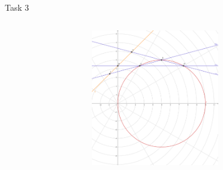 \documentclass[aspectratio=169]{beamer}
\begin{document}
\begin{frame}[t]{Task 3}
{\begin{columns}[T,onlytextwidth]
            \begin{column}{0.49\textwidth}
                \vspace{-0.5cm}
                \begin{figure}[H]
                    \href{https://www.geogebra.org/calculator/jcvzq4d6}{
                        \centering\includegraphics[height=6cm,width=1\textwidth,keepaspectratio]{task_3.png}}
                \end{figure}
            \end{column}
        \end{columns}
    }
\end{frame}
\end{document}
